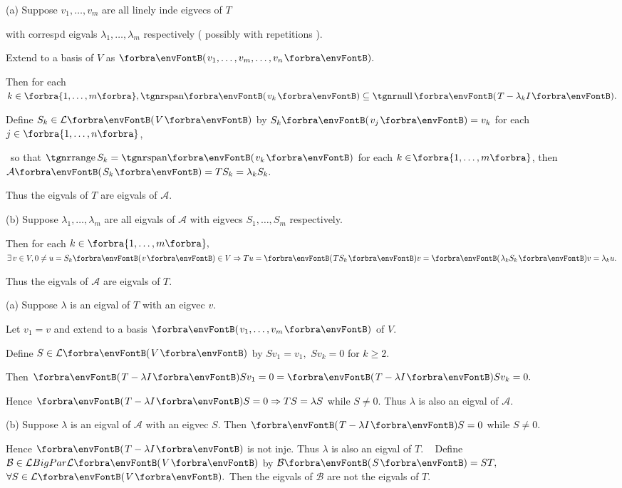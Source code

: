 \documentclass[a4paper, 11pt, UTF8]{article}
\begin{document}
\begin{large}
\par
(a) Suppose $v_1,\dots,v_m$ are all linely inde eigvecs of $T$\par\quad\Ha
with correspd eigvals $\lambda_1,\dots,\lambda_m$ respectively ( possibly with repetitions ).\par\quad\Ha
Extend to a basis of $V$ as $\Par{v_1,\dots,v_m,\dots,v_n}.$\par\quad\Ha
Then for each $k\in\Bra{1,\dots,m},\Span{v_k}\subseteq\null\Par{T-\lambda_k I}.$\par\quad\Ha
Define $S_k\in\Lm{V}$ by $S_k\Par{v_j}=v_k$ for each $j\in\Bra{1,\dots,n}$,\par\quad\Ha\qquad\,
so that $\range S_k=\Span{v_k}$ for each $k\in\!\Bra{1,\dots,m}$, then $\mathcal{A}\Par{S_k}=TS_k=\lambda_k S_k.$\par\quad\Ha
Thus the eigvals of $T$ are eigvals of $\mathcal{A}.$\par\quad
(b) Suppose $\lambda_1,\dots,\lambda_m$ are all eigvals of $\mathcal{A}$ with eigvecs $S_1,\dots,S_m$ respectively.\par\quad\Hb
Then for each $k\in\Bra{1,\dots,m},$ $\exists\,v\in V,0\neq u=S_k\Par{v}\in V\Rightarrow Tu=\Par{TS_k} v=\Par{\lambda_k S_k} v=\lambda_k u.$\par\quad\Hb
Thus the eigvals of $\mathcal{A}$ are eigvals of $T.$\PfEnd\vspace{6pt}\quad
\Or \par\quad
(a) Suppose $\lambda$ is an eigval of $T$ with an eigvec $v.$\par\quad\Ha
Let $v_1=v$ and extend to a basis $\Par{v_1,\dots,v_m}$ of $V.$\par\quad\Ha
Define $S\in\Lm{V}$ by $Sv_1=v_1,\,\,Sv_k=0$ for $k\geqslant 2.$\par\quad\Ha
Then $\Par{T-\lambda I}Sv_1=0=\Par{T-\lambda I}Sv_k=0.$\par\quad\Ha
Hence $\Par{T-\lambda I}S=0\Rightarrow TS=\lambda S$ while $S\neq 0.$ Thus $\lambda$ is also an eigval of $\mathcal{A}.$\par\quad
(b) Suppose $\lambda$ is an eigval of $\mathcal{A}$ with an eigvec $S.$ Then $\Par{T-\lambda I}S=0$ while $S\neq 0.$\par\quad\Hb
Hence $\Par{T-\lambda I}$ is not inje. Thus $\lambda$ is also an eigval of $T.$\PfEnd
\Comment\,\,\, {\normalsize\envFontSmall Define $\mathcal{B}\in\Lm[BigPar]{\Lm{V}}$ by $\mathcal{B}\Par{S}=ST,$ $\forall S\in\Lm{V}.$
Then the eigvals of $\mathcal{B}$ are not the eigvals of $T.$}\par
\SepLine


\end{large}
\end{document}
